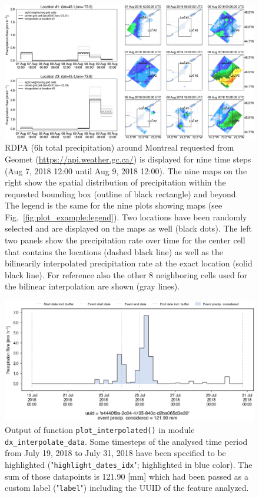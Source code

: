 \documentclass[10pt,a4paper,titlepage,parskip]{scrartcl}
\begin{document}
\begin{figure}[h!]
	\centering
	\includegraphics[width=\linewidth]{figures/test-bilinear-interpolation.png}
	\caption{RDPA (6h total precipitation) around Montreal requested from Geomet (\url{https://api.weather.gc.ca/}) is displayed for nine time steps (Aug 7, 2018 12:00 until Aug 9, 2018 12:00). The nine maps on the right show the spatial distribution of precipitation within the requested bounding box (outline of black rectangle) and beyond. The legend is the same for the nine plots showing maps (see Fig.~\ref{fig:plot_example:legend}). Two locations have been randomly selected and are displayed on the maps as well (black dots). The left two panels show the precipitation rate over time for the center cell that contains the locations (dashed black line) as well as the bilinearily interpolated precipitation rate at the exact location (solid black line). For reference also the other 8 neighboring cells used for the bilinear interpolation are shown (gray lines).}
	\label{fig:plot_example:bilinear}
\end{figure}

\begin{figure}[h!]
	\centering
	\includegraphics[width=\linewidth]{figures/test-plot-interpolated.png}
	\caption{Output of function \texttt{plot\_interpolated()} in module \texttt{dx\_interpolate\_data}. Some timesteps of the analysed time period from July 19, 2018 to July 31, 2018 have been specified to be highlighted ("\texttt{highlight\_dates\_idx}"; highlighted in blue color). The sum of those datapoints is 121.90 [mm] which had been passed as a custom label ("\texttt{label}") including the UUID of the feature analyzed.}
	\label{fig:plot_example:plot_interpolated}
\end{figure}
\end{document}
